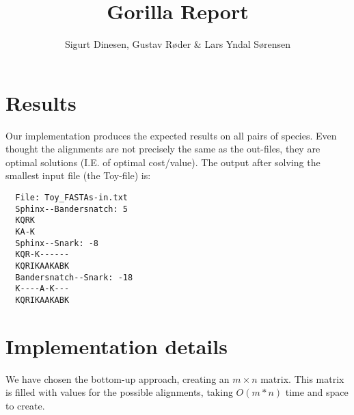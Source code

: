 \documentclass{tufte-handout}
\title{Gorilla Report}
\author{Sigurt Dinesen, Gustav Røder \& Lars Yndal Sørensen}
\begin{document}
  \maketitle

  \section{Results}
	Our implementation produces the expected results on all pairs of
	species. Even thought the alignments are not precisely the same as the
	out-files, they are optimal solutions (I.E. of optimal cost/value).
	The output after solving the smallest input file (the Toy-file) is:

  \begin{fullwidth}\small
  	\begin{verbatim}
  File: Toy_FASTAs-in.txt
  Sphinx--Bandersnatch: 5
  KQRK
  KA-K
  Sphinx--Snark: -8
  KQR-K------
  KQRIKAAKABK
  Bandersnatch--Snark: -18
  K----A-K---
  KQRIKAAKABK
   \end{verbatim}
\end{fullwidth}


  \section{Implementation details}
	We have chosen the bottom-up approach, creating an $m\times n$ matrix.
	This matrix is filled with values for the possible alignments, taking
	$O(m*n)$ time and space to create.
\end{document}
